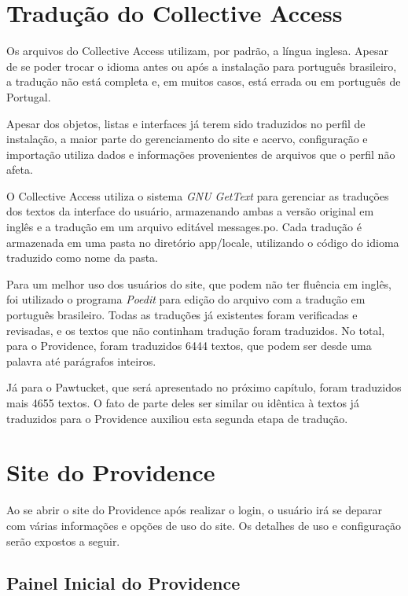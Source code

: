\documentclass[a4paper,12pt,oneside,onecolumn,final,fleqn]{repUERJ}
\begin{document}
\section{Tradução do Collective Access}

Os arquivos do Collective Access utilizam, por padrão, a língua inglesa. Apesar de se poder trocar o idioma antes ou após a instalação para português brasileiro, a tradução não está completa e, em muitos casos, está errada ou em português de Portugal.

Apesar dos objetos, listas e interfaces já terem sido traduzidos no perfil de instalação, a maior parte do gerenciamento do site e acervo, configuração e importação utiliza dados e informações provenientes de arquivos que o perfil não afeta.

O Collective Access utiliza o sistema \textit{GNU GetText} para gerenciar as traduções dos textos da interface do usuário, armazenando ambas a versão original em inglês e a tradução em um arquivo editável messages.po. Cada tradução é armazenada em uma pasta no diretório app/locale, utilizando o código do idioma traduzido como nome da pasta.

Para um melhor uso dos usuários do site, que podem não ter fluência em inglês, foi utilizado o programa \textit{Poedit} para edição do arquivo com a tradução em português brasileiro. Todas as traduções já existentes foram verificadas e revisadas, e os textos que não continham tradução foram traduzidos. No total, para o Providence, foram traduzidos 6444 textos, que podem ser desde uma palavra até parágrafos inteiros. 

Já para o Pawtucket, que será apresentado no próximo capítulo, foram traduzidos mais 4655 textos. O fato de parte deles ser similar ou idêntica à textos já traduzidos para o Providence auxiliou esta segunda etapa de tradução.

\section{Site do Providence}

Ao se abrir o site do Providence após realizar o login, o usuário irá se deparar com várias informações e opções de uso do site. Os detalhes de uso e configuração serão expostos a seguir.

\subsection{Painel Inicial do Providence}
\end{document}
